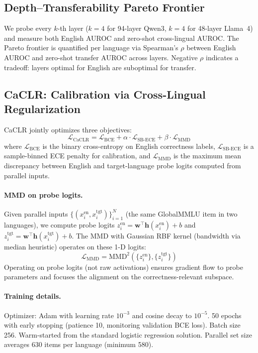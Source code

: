 \documentclass[11pt,a4paper]{article}
\begin{document}
\subsection{Depth--Transferability Pareto Frontier}

We probe every $k$-th layer ($k=4$ for 94-layer Qwen3, $k=4$ for 48-layer Llama~4) and measure both English AUROC and zero-shot cross-lingual AUROC.
The Pareto frontier is quantified per language via Spearman's $\rho$ between English AUROC and zero-shot transfer AUROC across layers.
Negative $\rho$ indicates a tradeoff: layers optimal for English are suboptimal for transfer.

\subsection{CaCLR: Calibration via Cross-Lingual Regularization}
\label{sec:caclr_method}

CaCLR jointly optimizes three objectives:
\begin{equation}
\mathcal{L}_{\text{CaCLR}} = \mathcal{L}_{\text{BCE}} + \alpha \cdot \mathcal{L}_{\text{SB-ECE}} + \beta \cdot \mathcal{L}_{\text{MMD}}
\end{equation}
where $\mathcal{L}_{\text{BCE}}$ is the binary cross-entropy on English correctness labels, $\mathcal{L}_{\text{SB-ECE}}$ is a sample-binned ECE penalty for calibration, and $\mathcal{L}_{\text{MMD}}$ is the maximum mean discrepancy between English and target-language probe logits computed from parallel inputs.

\paragraph{MMD on probe logits.}
Given parallel inputs $\{(x_i^{\text{en}}, x_i^{\text{tgt}})\}_{i=1}^N$ (the same GlobalMMLU item in two languages), we compute probe logits $z_i^{\text{en}} = \mathbf{w}^\top \mathbf{h}(x_i^{\text{en}}) + b$ and $z_i^{\text{tgt}} = \mathbf{w}^\top \mathbf{h}(x_i^{\text{tgt}}) + b$.
The MMD with Gaussian RBF kernel (bandwidth via median heuristic) operates on these 1-D logits:
\begin{equation}
\mathcal{L}_{\text{MMD}} = \text{MMD}^2\!\left(\{z_i^{\text{en}}\}, \{z_i^{\text{tgt}}\}\right)
\end{equation}
Operating on probe logits (not raw activations) ensures gradient flow to probe parameters and focuses the alignment on the correctness-relevant subspace.

\paragraph{Training details.}
Optimizer: Adam with learning rate $10^{-3}$ and cosine decay to $10^{-5}$.
50 epochs with early stopping (patience 10, monitoring validation BCE loss).
Batch size 256.
Warm-started from the standard logistic regression solution.
Parallel set size averages 630 items per language (minimum 580).
\end{document}
